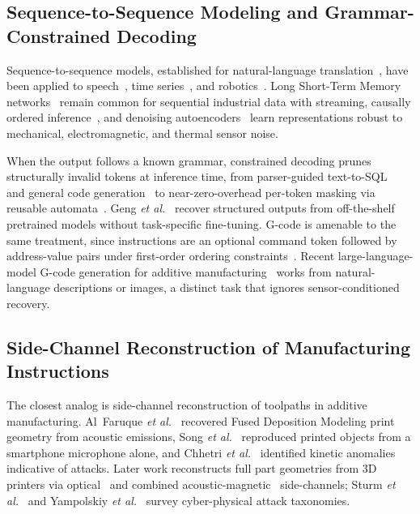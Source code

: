 \documentclass[sensors,article,submit,moreauthors,pdftex]{Definitions/mdpi}
\newcommand{\etal}{\textit{et al.}}
\begin{document}
\subsection{Sequence-to-Sequence Modeling and Grammar-Constrained Decoding}
\label{sec:related-seq2seq}

Sequence-to-sequence models, established for natural-language translation~\cite{sutskever2014sequence,bahdanau2014neural,vaswani2017attention}, have been applied to speech~\cite{graves2013speech}, time series~\cite{wen2023transformers}, and robotics~\cite{robotics_s2s}. Long Short-Term Memory networks~\cite{hochreiter1997long} remain common for sequential industrial data with streaming, causally ordered inference~\cite{malhotra2015lstm}, and denoising autoencoders~\cite{vincent2010stacked} learn representations robust to mechanical, electromagnetic, and thermal sensor noise.

When the output follows a known grammar, constrained decoding prunes structurally invalid tokens at inference time, from parser-guided text-to-SQL~\cite{picard} and general code generation~\cite{synchromesh,lmql} to near-zero-overhead per-token masking via reusable automata~\cite{outlines,xgrammar}. Geng \etal~\cite{geng2023gcd} recover structured outputs from off-the-shelf pretrained models without task-specific fine-tuning. G-code is amenable to the same treatment, since instructions are an optional command token followed by address-value pairs under first-order ordering constraints~\cite{grammar_paper,gcode_foundational}. Recent large-language-model G-code generation for additive manufacturing~\cite{gllm,image2gcode,chatcnc} works from natural-language descriptions or images, a distinct task that ignores sensor-conditioned recovery.

\subsection{Side-Channel Reconstruction of Manufacturing Instructions}
\label{sec:related-sidechan}

The closest analog is side-channel reconstruction of toolpaths in additive manufacturing. Al~Faruque \etal~\cite{alfaruque2016acoustic} recovered Fused Deposition Modeling print geometry from acoustic emissions, Song \etal~\cite{song2016my} reproduced printed objects from a smartphone microphone alone, and Chhetri \etal~\cite{chhetri2016kcad} identified kinetic anomalies indicative of attacks. Later work reconstructs full part geometries from 3D printers via optical~\cite{chattopadhyay2025video} and combined acoustic-magnetic~\cite{jamarani2024screg} side-channels; Sturm \etal~\cite{sturm2014cyber} and Yampolskiy \etal~\cite{yampolskiy2018security} survey cyber-physical attack taxonomies.
\end{document}
